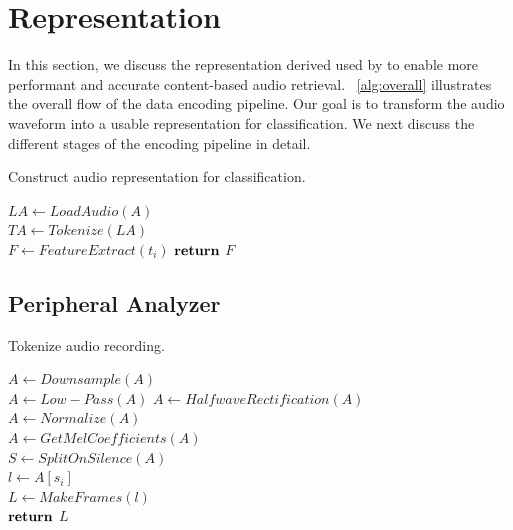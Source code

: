 \section{Representation}

In this section, we discuss the representation derived used by \sys to enable
more performant and accurate content-based audio retrieval.
%
~\cref{alg:overall} illustrates the overall flow of the data encoding pipeline.
%
Our goal is to transform the audio waveform into a usable representation for
classification.
%
We next discuss the different stages of the encoding pipeline in detail.

\begin{algorithm}[t!]
    \caption{Construct audio representation for classification.}
	\label{alg:overall}
    \SetAlgoLined
    
     {
        $LA \gets LoadAudio(A)$\\
        $TA \gets Tokenize(LA)$\\
         {
            $F \gets FeatureExtract(t_i)$
        }
        $\Return$ $F$
    }
\end{algorithm}

\subsection{Peripheral Analyzer}
\label{sec:analyzer}

\begin{algorithm}[t!]
    \caption{Tokenize audio recording.}\label{encoder}
    \SetAlgoLined
    
     {
        $A \gets Downsample(A)$\\
        $A \gets Low-Pass(A)$
        $A \gets HalfwaveRectification(A)$\\
        $A \gets Normalize(A)$\\
        $A \gets GetMelCoefficients(A)$\\
        $S \gets SplitOnSilence(A)$\\
         {
            $l \gets A[s_i]$\\
            $L \gets MakeFrames(l)$\\
        }
        $\Return$ $L$
    }
\end{algorithm}

